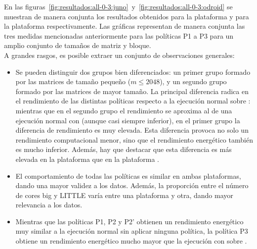 En las
figuras~\ref{fig:resultados:all-0-3:juno}~y~\ref{fig:resultados:all-0-3:odroid}
se muestran de manera conjunta los resultados obtenidos para la plataforma
\juno y para la plataforma \odroid respectivamente. Las gráficas
representan de manera conjunta las tres medidas mencionadas anteriormente
para las políticas P1 a P3 para un amplio conjunto de tamaños de matriz y
bloque.\\
A grandes rasgos, es posible extraer un conjunto de observaciones
generales:
\begin{itemize}
\item Se pueden distinguir dos grupos bien diferenciados: un primer grupo
  formado por las matrices de tamaño pequeño ($m \le 2048$), y un segundo
  grupo formado por las matrices de mayor tamaño. La principal diferencia
  radica en el rendimiento de las distintas políticas respecto a la
  ejecución normal sobre \botlev: mientras que en el segundo grupo el
  rendimiento se aproxima al de una ejecución normal con \botlev (aunque
  casi siempre inferior), en el primer grupo la diferencia de rendimiento
  es muy elevada. Esta diferencia provoca no solo un rendimiento
  computacional menor, sino que el rendimiento energético también es mucho
  inferior. Además, hay que destacar que esta diferencia es más elevada en
  la plataforma \odroid que en la plataforma \juno.
\item El comportamiento de todas las políticas es similar en ambas
  plataformas, dando una mayor validez a los datos. Además, la proporción
  entre el número de cores big y LITTLE varía entre una plataforma y otra,
  dando mayor relevancia a los datos.
\item Mientras que las políticas P1, P2 y P2' obtienen un rendimiento
  energético muy similar a la ejecución normal sin aplicar ninguna
  política, la política P3 obtiene un rendimiento energético mucho mayor
  que la ejecución con \botlev sobre \ompss.
\end{itemize}  

